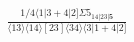 \documentclass[varwidth, border=5pt]{standalone}
\begin{document}
\begin{my}
$\begin{gathered}
\scriptscriptstyle\frac{1/4⟨1|3+4|2]Σ5_{14|23|𝟓}}{⟨13⟩⟨14⟩[23]⟨34⟩⟨3|1+4|2]}
\end{gathered}$
\end{my}
\end{document}
